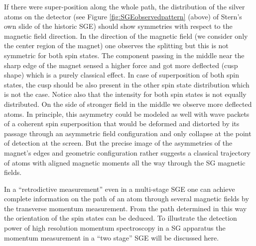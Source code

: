 \documentclass{article}
\begin{document}
If there were super-position along the whole path, the distribution of the silver atoms on the detector (see Figure \ref{fig:SGEobservedpattern} (above) of Stern's own slide of the historic SGE) should show symmetries with respect to the magnetic field direction. In the direction of the magnetic field (we consider only the center region of the magnet) one observes the splitting but this is not symmetric for both spin states. The component passing in the middle near the sharp edge of the magnet sensed a higher force and got more deflected (cusp shape) which is a purely classical effect. In case of superposition of both spin states, the cusp should be also present in the other spin state distribution which is not the case. Notice also that the intensity for both spin states is not equally distributed. On the side of stronger field in the middle we observe more deflected atoms. In principle, this asymmetry could be modeled as well with wave packets of a coherent spin superposition that would be deformed and distorted by its passage through an asymmetric field configuration and only collapse at the point of detection at the screen. But the precise image of the asymmetries of the magnet's edges and geometric configuration rather suggests a classical trajectory of atoms with aligned magnetic moments all the way through the SG magnetic fields.

In a ``retrodictive measurement'' even in a multi-stage SGE one can achieve complete information on the path of an atom through several magnetic fields by the transverse momentum measurement. From the path determined in this way the orientation of the spin states can be deduced. To illustrate the detection power of high resolution momentum spectroscopy in a SG apparatus the momentum measurement in a  ``two stage'' SGE will be discussed here. 
\end{document}
